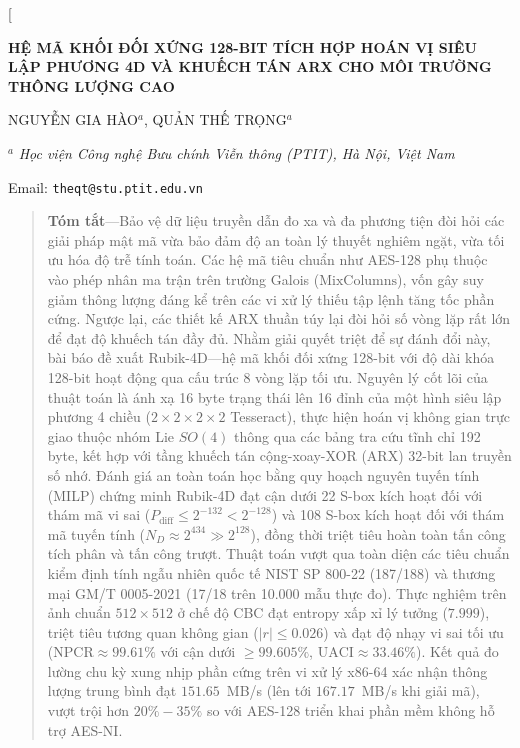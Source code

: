 \documentclass[10pt,twocolumn]{article}
\begin{document}
\twocolumn[
  \begin{@twocolumnfalse}
    \vspace{0.8cm}
    \begin{center}
      {\large \bfseries \MakeUppercase{Hệ Mã Khối Đối Xứng 128-bit Tích Hợp Hoán Vị Siêu Lập Phương 4D và Khuếch Tán ARX Cho Môi Trường Thông Lượng Cao}\par}
      \vspace{0.6cm}
      
      {\normalsize \MakeUppercase{Nguyễn Gia Hào}$^{a}$, \MakeUppercase{Quản Thế Trọng}$^{a}$\par}
      \vspace{0.4cm}
      
      {\small $^{a}$ \textit{Học viện Công nghệ Bưu chính Viễn thông (PTIT), Hà Nội, Việt Nam}\par}
      
      {\small Email: \texttt{theqt@stu.ptit.edu.vn}\par}
      \vspace{0.6cm}
    \end{center}

    \begin{quote}
      \small
      \textbf{Tóm tắt}—Bảo vệ dữ liệu truyền dẫn đo xa và đa phương tiện đòi hỏi các giải pháp mật mã vừa bảo đảm độ an toàn lý thuyết nghiêm ngặt, vừa tối ưu hóa độ trễ tính toán. Các hệ mã tiêu chuẩn như AES-128 phụ thuộc vào phép nhân ma trận trên trường Galois ($\text{MixColumns}$), vốn gây suy giảm thông lượng đáng kể trên các vi xử lý thiếu tập lệnh tăng tốc phần cứng. Ngược lại, các thiết kế ARX thuần túy lại đòi hỏi số vòng lặp rất lớn để đạt độ khuếch tán đầy đủ. Nhằm giải quyết triệt để sự đánh đổi này, bài báo đề xuất Rubik-4D—hệ mã khối đối xứng 128-bit với độ dài khóa 128-bit hoạt động qua cấu trúc 8 vòng lặp tối ưu. Nguyên lý cốt lõi của thuật toán là ánh xạ 16 byte trạng thái lên 16 đỉnh của một hình siêu lập phương 4 chiều ($2 \times 2 \times 2 \times 2$ Tesseract), thực hiện hoán vị không gian trực giao thuộc nhóm Lie $SO(4)$ thông qua các bảng tra cứu tĩnh chỉ 192 byte, kết hợp với tầng khuếch tán cộng-xoay-XOR (ARX) 32-bit lan truyền số nhớ. Đánh giá an toàn toán học bằng quy hoạch nguyên tuyến tính (MILP) chứng minh Rubik-4D đạt cận dưới 22 S-box kích hoạt đối với thám mã vi sai ($P_{\text{diff}} \le 2^{-132} < 2^{-128}$) và 108 S-box kích hoạt đối với thám mã tuyến tính ($N_D \approx 2^{434} \gg 2^{128}$), đồng thời triệt tiêu hoàn toàn tấn công tích phân và tấn công trượt. Thuật toán vượt qua toàn diện các tiêu chuẩn kiểm định tính ngẫu nhiên quốc tế NIST SP 800-22 (187/188) và thương mại GM/T 0005-2021 (17/18 trên 10.000 mẫu thực đo). Thực nghiệm trên ảnh chuẩn $512 \times 512$ ở chế độ CBC đạt entropy xấp xỉ lý tưởng ($7.999$), triệt tiêu tương quan không gian ($|r| \le 0.026$) và đạt độ nhạy vi sai tối ưu ($\text{NPCR} \approx 99.61\%$ với cận dưới $\ge 99.605\%$, $\text{UACI} \approx 33.46\%$). Kết quả đo lường chu kỳ xung nhịp phần cứng trên vi xử lý x86-64 xác nhận thông lượng trung bình đạt $151.65$~MB/s (lên tới $167.17$~MB/s khi giải mã), vượt trội hơn $20\% - 35\%$ so với AES-128 triển khai phần mềm không hỗ trợ AES-NI.
      \vspace{0.3cm}
      

\end{quote}
\end{@twocolumnfalse}
\end{document}
